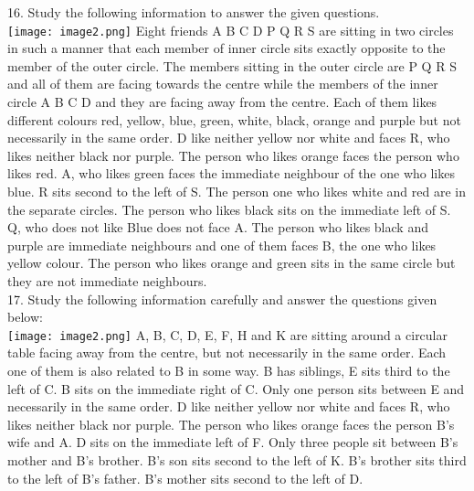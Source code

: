 \documentclass[
]{article}
\begin{document}
16. Study the following information to answer the given questions.\\
\texttt{[image: image2.png]}
Eight friends A B C D P Q R S are sitting in two circles in such a manner that each member
of inner circle sits exactly opposite to the member of the outer circle. The members sitting in
the outer circle are P Q R S and all of them are facing towards the centre while the members
of the inner circle A B C D and they are facing away from the centre. Each of them likes
different colours red, yellow, blue, green, white, black, orange and purple but not
necessarily in the same order. D like neither yellow nor white and faces R, who likes neither
black nor purple. The person who likes orange faces the person who likes red. A, who likes
green faces the immediate neighbour of the one who likes blue. R sits second to the left of S.
The person one who likes white and red are in the separate circles. The person who likes
black sits on the immediate left of S. Q, who does not like Blue does not face A. The person
who likes black and purple are immediate neighbours and one of them faces B, the one who
likes yellow colour. The person who likes orange and green sits in the same circle but they
are not immediate neighbours.\\

17. Study the following information carefully and answer the questions given below:\\
\texttt{[image: image2.png]}
A, B, C, D, E, F, H and K are sitting around a circular table facing away from the centre, but
not necessarily in the same order. Each one of them is also related to B in some way. B has
siblings, E sits third to the left of C. B sits on the immediate right of C. Only one person sits
between E and necessarily in the same order. D like neither yellow nor white and faces R,
who likes neither black nor purple. The person who likes orange faces the person B’s wife
and A. D sits on the immediate left of F. Only three people sit between B’s mother and B’s
brother. B’s son sits second to the left of K. B’s brother sits third to the left of B’s father. B’s
mother sits second to the left of D.\\
\end{document}
